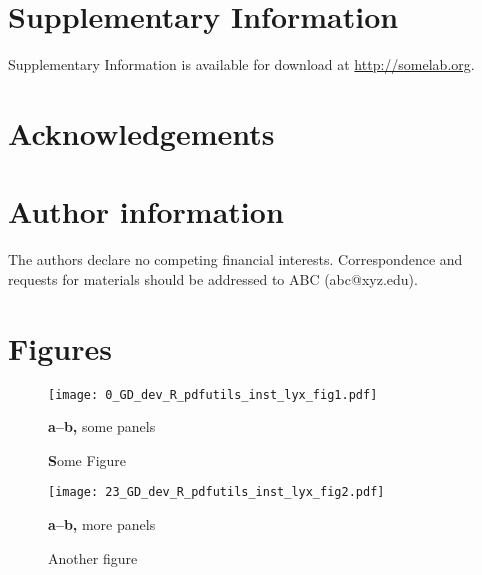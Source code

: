 \documentclass[11pt,british,super,sort&compress]{article}
\begin{document}
\section{Supplementary Information}

Supplementary Information is available for download at \url{http://somelab.org}.


\section{Acknowledgements}


\section{Author information}

The authors declare no competing financial interests. Correspondence
and requests for materials should be addressed to ABC (abc@xyz.edu).\newpage{}\pagestyle{empty}


\section{Figures}



\begin{figure*}[h]
\begin{centering}
\texttt{[image: 0\_GD\_dev\_R\_pdfutils\_inst\_lyx\_fig1.pdf]}\caption{\label{fig:wt}\textbf{S}ome Figure}

\par\end{centering}

\textbf{\footnotesize a--b, }{\footnotesize some panels}
\end{figure*}


\newpage{}
\begin{figure*}[h]
\begin{centering}
\texttt{[image: 23\_GD\_dev\_R\_pdfutils\_inst\_lyx\_fig2.pdf]}\caption{\label{fig:Or67d}Another figure}

\par\end{centering}

\textbf{\footnotesize a--b,}{\footnotesize{} more panels}
\end{figure*}


\newpage{}

\appendix
\pagestyle{plain}\setcounter{page}{1}%
\end{document}
